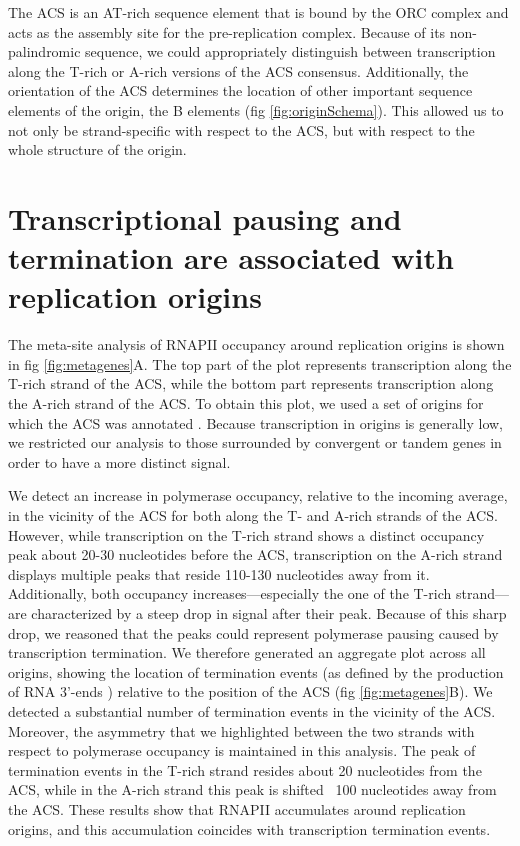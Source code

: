 The ACS is an AT-rich sequence element that is bound by the ORC complex and acts as the assembly site for the pre-replication complex. Because of its non-palindromic sequence, we could appropriately distinguish between transcription along the T-rich or A-rich versions of the ACS consensus. Additionally, the orientation of the ACS determines the location of other important sequence elements of the origin, the B elements (fig \ref{fig:originSchema}). This allowed us to not only be strand-specific with respect to the ACS, but with respect to the whole structure of the origin. 

\section{Transcriptional pausing and termination are associated with replication origins}

The meta-site analysis of RNAPII occupancy around replication origins is shown in fig \ref{fig:metagenes}A. The top part of the plot represents transcription along the T-rich strand of the ACS, while the bottom part represents transcription along the A-rich strand of the ACS. To obtain this plot, we used a set of origins for which the ACS was annotated \cite{nieduszynski:2006:genomewide}. Because transcription in origins is generally low, we restricted our analysis to those surrounded by convergent or tandem genes in order to have a more distinct signal. 



We detect an increase in polymerase occupancy, relative to the incoming average, in the vicinity of the ACS for both along the T- and A-rich strands of the ACS.
However, while transcription on the T-rich strand shows a distinct occupancy peak about 20-30 nucleotides before the ACS, transcription on the A-rich strand displays multiple peaks that reside 110-130 nucleotides away from it.
 Additionally, both occupancy increases—especially the one of the T-rich strand—are characterized by a steep drop in signal after their peak. Because of this sharp drop, we reasoned that the peaks could represent polymerase pausing caused by transcription termination. 
We therefore generated an aggregate plot across all origins, showing the location of termination events (as defined by the production of RNA 3’-ends \cite{wilkening:2013:efficient}) relative to the position of the ACS (fig \ref{fig:metagenes}B). 
We detected a substantial number of termination events in the vicinity of the ACS. 
Moreover, the asymmetry that we highlighted between the two strands with respect to polymerase occupancy is maintained in this analysis. 
The peak of termination events in the T-rich strand resides about 20 nucleotides from the ACS, while in the A-rich strand this peak is shifted ~100 nucleotides away from the ACS. 
These results show that RNAPII accumulates around replication origins, and this accumulation coincides with transcription termination events. 
  
